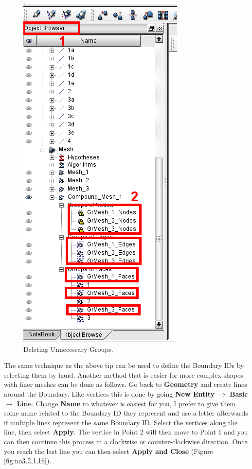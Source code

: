 \begin{figure}[tbp]
\begin{center}
\includegraphics[scale=0.50]{figures/SalomeStep5b.png}
\caption{Deleting Unnecessary Groups.}
\label{fig:no3.2.1.15}
\end{center}
\end{figure}
          
The same technique as the above tip can be used to define the Boundary IDs by selecting them by hand. Another method that is easier for more complex shapes with finer meshes can be done as follows. Go back to \textbf{Geometry} and create lines around the Boundary. Like vertices this is done by going \textbf{New Entity} $\rightarrow$ \textbf{Basic} $\rightarrow$ \textbf{Line}. Change \textbf{Name} to whatever is easiest for you, I prefer to give them some name related to the Boundary ID they represent and use a letter afterwards if multiple lines represent the same Boundary ID. Select the vertices along the line, then select \textbf{Apply}. The vertice in Point 2 will then move to Point 1 and you can then continue this process in a clockwise or counter-clockwise direction. Once you reach the last line you can then select \textbf{Apply and Close} (Figure \ref{fig:no3.2.1.16}).
  

